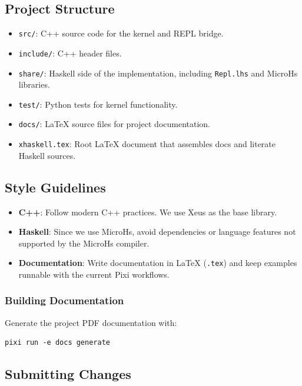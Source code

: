 \subsection{Project Structure}


\begin{itemize}
\item \texttt{src/}: C++ source code for the kernel and REPL bridge.
\item \texttt{include/}: C++ header files.
\item \texttt{share/}: Haskell side of the implementation, including \texttt{Repl.lhs} and MicroHs libraries.
\item \texttt{test/}: Python tests for kernel functionality.
\item \texttt{docs/}: LaTeX source files for project documentation.
\item \texttt{xhaskell.tex}: Root LaTeX document that assembles docs and literate Haskell sources.
\end{itemize}


\subsection{Style Guidelines}


\begin{itemize}
\item \textbf{C++}: Follow modern C++ practices. We use Xeus as the base library.
\item \textbf{Haskell}: Since we use MicroHs, avoid dependencies or language features not supported by the MicroHs compiler.
\item \textbf{Documentation}: Write documentation in LaTeX (\texttt{.tex}) and keep examples runnable with the current Pixi workflows.
\end{itemize}

\subsubsection{Building Documentation}

Generate the project PDF documentation with:
\begin{verbatim}
pixi run -e docs generate
\end{verbatim}


\subsection{Submitting Changes}


